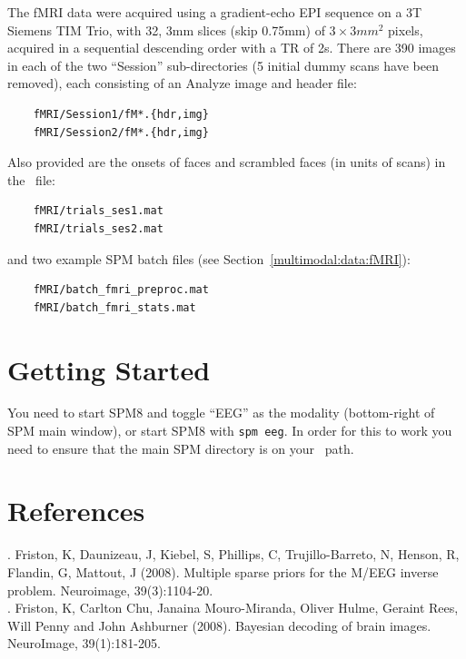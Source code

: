 The fMRI data were acquired using a gradient-echo EPI sequence on a 3T Siemens TIM Trio, with 32, 3mm slices (skip 0.75mm) of $3\times 3 mm^2$ pixels, acquired in a sequential descending order with a TR of 2s. There are 390 images in each of the two ``Session'' sub-directories (5 initial dummy scans have been removed), each consisting of an Analyze image and header file:
\begin{verbatim}
    fMRI/Session1/fM*.{hdr,img}
    fMRI/Session2/fM*.{hdr,img}
\end{verbatim}
Also provided are the onsets of faces and scrambled faces (in units of scans) in the \matlab\ file:
\begin{verbatim}
    fMRI/trials_ses1.mat
    fMRI/trials_ses2.mat
\end{verbatim}
and two example SPM batch files (see Section~\ref{multimodal:data:fMRI}):
\begin{verbatim}
    fMRI/batch_fmri_preproc.mat
    fMRI/batch_fmri_stats.mat
\end{verbatim}


\section{Getting Started}

You need to start SPM8 and toggle ``EEG'' as the modality (bottom-right of SPM main window), or start SPM8 with \texttt{spm eeg}. In order for this to work you need to ensure that the main SPM directory is on your \matlab\ path.










\section{References}

. Friston, K, Daunizeau, J, Kiebel, S, Phillips, C, Trujillo-Barreto, N, Henson, R, Flandin, G, Mattout, J (2008). Multiple sparse priors for the M/EEG inverse problem. Neuroimage, 39(3):1104-20.\\

. Friston, K, Carlton Chu, Janaina Mouro-Miranda, Oliver Hulme, Geraint Rees, Will Penny and John Ashburner (2008). Bayesian decoding of brain images. NeuroImage, 39(1):181-205.\\

